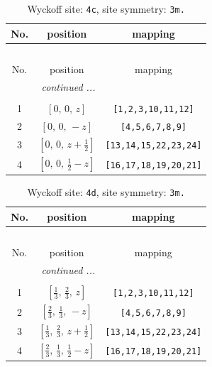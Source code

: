 \documentclass[fleqn,8pt]{jsarticle}
\begin{document}
\renewcommand{\arraystretch}{1.2}
\begin{longtable}{ccc}
\caption{Wyckoff site: {\tt 4c}, site symmetry: {\tt 3m.}}
 \\
 \hline \hline
No. & position & mapping \\ \hline \endfirsthead

\multicolumn{2}{l}{\tablename\ \thetable{}} \\
 \hline \hline
No. & position & mapping \\ \hline \endhead

 \hline \hline
\multicolumn{2}{r}{\footnotesize\it continued ...} \\ \endfoot

 \hline \hline
\multicolumn{2}{r}{} \\ \endlastfoot

1 & $\left[ 0,\, 0,\, z \right]$ & {\tt [1,2,3,10,11,12]} \\ \hline
2 & $\left[ 0,\, 0,\, - z \right]$ & {\tt [4,5,6,7,8,9]} \\ \hline
3 & $\left[ 0,\, 0,\, z + \frac{1}{2} \right]$ & {\tt [13,14,15,22,23,24]} \\ \hline
4 & $\left[ 0,\, 0,\, \frac{1}{2} - z \right]$ & {\tt [16,17,18,19,20,21]} \\
\end{longtable}
\renewcommand{\arraystretch}{1.2}
\begin{longtable}{ccc}
\caption{Wyckoff site: {\tt 4d}, site symmetry: {\tt 3m.}}
 \\
 \hline \hline
No. & position & mapping \\ \hline \endfirsthead

\multicolumn{2}{l}{\tablename\ \thetable{}} \\
 \hline \hline
No. & position & mapping \\ \hline \endhead

 \hline \hline
\multicolumn{2}{r}{\footnotesize\it continued ...} \\ \endfoot

 \hline \hline
\multicolumn{2}{r}{} \\ \endlastfoot

1 & $\left[ \frac{1}{3},\, \frac{2}{3},\, z \right]$ & {\tt [1,2,3,10,11,12]} \\ \hline
2 & $\left[ \frac{2}{3},\, \frac{1}{3},\, - z \right]$ & {\tt [4,5,6,7,8,9]} \\ \hline
3 & $\left[ \frac{1}{3},\, \frac{2}{3},\, z + \frac{1}{2} \right]$ & {\tt [13,14,15,22,23,24]} \\ \hline
4 & $\left[ \frac{2}{3},\, \frac{1}{3},\, \frac{1}{2} - z \right]$ & {\tt [16,17,18,19,20,21]} \\
\end{longtable}
\end{document}
